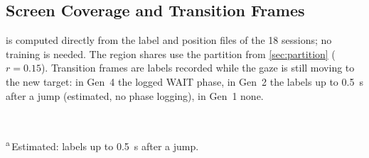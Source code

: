 \subsection{Screen Coverage and Transition Frames}

 is computed directly from the label and position files of the
18 sessions; no training is needed. The region shares
use the partition from \cref{sec:partition} ($r=0.15$). Transition frames are
labels recorded while the gaze is still moving to the new target: in Gen~4 the
logged WAIT phase, in Gen~2 the labels up to \SI{0.5}{\second} after a jump
(estimated, no phase logging), in Gen~1 none.

\begin{table}[htbp]
  \centering
  \caption[Coverage and transition frames per design]{Screen coverage and transition frames per design (mean over the
           sessions of each generation). Cells: share of the 100 cells of a
           $10\times10$ grid with at least one label; Dist.: mean distance of
           the targets from the screen centre (normalized units).}
  \label{tab:design}
  \small
  \setlength{\tabcolsep}{4pt}
  \\[1mm]
  \parbox{0.95\linewidth}{\footnotesize \textsuperscript{a}\,Estimated: labels up
  to \SI{0.5}{\second} after a jump.}
\end{table}

